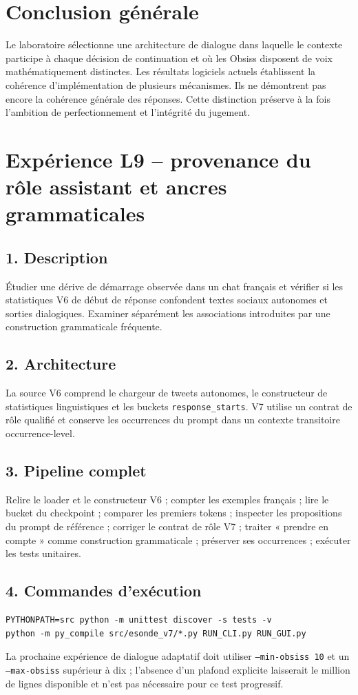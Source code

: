 \documentclass[11pt,a4paper]{report}
\begin{document}
\section{Conclusion générale}
Le laboratoire sélectionne une architecture de dialogue dans laquelle le contexte participe à chaque décision de continuation et où les Obsiss disposent de voix mathématiquement distinctes. Les résultats logiciels actuels établissent la cohérence d'implémentation de plusieurs mécanismes. Ils ne démontrent pas encore la cohérence générale des réponses. Cette distinction préserve à la fois l'ambition de perfectionnement et l'intégrité du jugement.


\section{Expérience L9 -- provenance du rôle assistant et ancres grammaticales}
\subsection{1. Description}
Étudier une dérive de démarrage observée dans un chat français et vérifier si les statistiques V6 de début de réponse confondent textes sociaux autonomes et sorties dialogiques. Examiner séparément les associations introduites par une construction grammaticale fréquente.
\subsection{2. Architecture}
La source V6 comprend le chargeur de tweets autonomes, le constructeur de statistiques linguistiques et les buckets \texttt{response\_starts}. V7 utilise un contrat de rôle qualifié et conserve les occurrences du prompt dans un contexte transitoire occurrence-level.
\subsection{3. Pipeline complet}
Relire le loader et le constructeur V6 ; compter les exemples français ; lire le bucket du checkpoint ; comparer les premiers tokens ; inspecter les propositions du prompt de référence ; corriger le contrat de rôle V7 ; traiter « prendre en compte » comme construction grammaticale ; préserver ses occurrences ; exécuter les tests unitaires.
\subsection{4. Commandes d'exécution}
\begin{verbatim}
PYTHONPATH=src python -m unittest discover -s tests -v
python -m py_compile src/esonde_v7/*.py RUN_CLI.py RUN_GUI.py
\end{verbatim}
La prochaine expérience de dialogue adaptatif doit utiliser \texttt{--min-obsiss 10} et un \texttt{--max-obsiss} supérieur à dix ; l'absence d'un plafond explicite laisserait le million de lignes disponible et n'est pas nécessaire pour ce test progressif.
\end{document}
